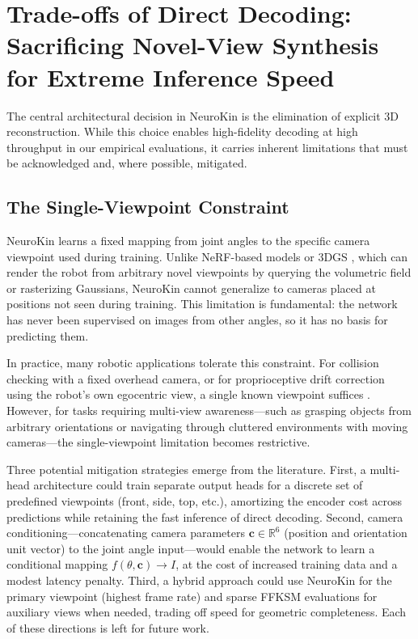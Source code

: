 \documentclass[12pt,a4paper,oneside]{report}
\begin{document}
\section{Trade-offs of Direct Decoding: Sacrificing Novel-View Synthesis for Extreme Inference Speed}

The central architectural decision in NeuroKin is the elimination of explicit 3D reconstruction. While this choice enables high-fidelity decoding at high throughput in our empirical evaluations, it carries inherent limitations that must be acknowledged and, where possible, mitigated.

\subsection{The Single-Viewpoint Constraint}
\label{subsec:the_single_viewpoint_constraint}

NeuroKin learns a fixed mapping from joint angles to the specific camera viewpoint used during training. Unlike NeRF-based models \cite{mildenhall2020nerf} or 3DGS \cite{kerbl20233d}, which can render the robot from arbitrary novel viewpoints by querying the volumetric field or rasterizing Gaussians, NeuroKin cannot generalize to cameras placed at positions not seen during training. This limitation is fundamental: the network has never been supervised on images from other angles, so it has no basis for predicting them.

In practice, many robotic applications tolerate this constraint. For collision checking with a fixed overhead camera, or for proprioceptive drift correction using the robot's own egocentric view, a single known viewpoint suffices \cite{hu2024teaching, chen2022full}. However, for tasks requiring multi-view awareness—such as grasping objects from arbitrary orientations or navigating through cluttered environments with moving cameras—the single-viewpoint limitation becomes restrictive.

Three potential mitigation strategies emerge from the literature. First, a multi-head architecture could train separate output heads for a discrete set of predefined viewpoints (front, side, top, etc.), amortizing the encoder cost across predictions while retaining the fast inference of direct decoding. Second, camera conditioning—concatenating camera parameters $\mathbf{c} \in \mathbb{R}^6$ (position and orientation unit vector) to the joint angle input—would enable the network to learn a conditional mapping $f(\theta, \mathbf{c}) \rightarrow I$, at the cost of increased training data and a modest latency penalty. Third, a hybrid approach could use NeuroKin for the primary viewpoint (highest frame rate) and sparse FFKSM evaluations for auxiliary views when needed, trading off speed for geometric completeness. Each of these directions is left for future work.
\end{document}
